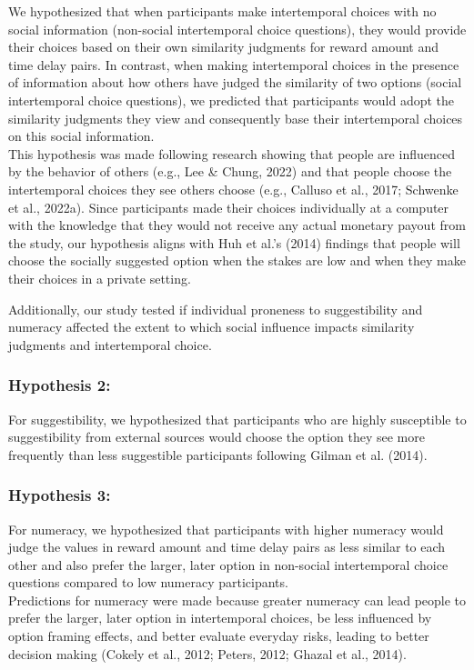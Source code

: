 \documentclass[
  pub,floatsintext]{apa6}
\begin{document}
We hypothesized that when participants make intertemporal choices with no social information (non-social intertemporal choice questions), they would provide their choices based on their own similarity judgments for reward amount and time delay pairs. In contrast, when making intertemporal choices in the presence of information about how others have judged the similarity of two options (social intertemporal choice questions), we predicted that participants would adopt the similarity judgments they view and consequently base their intertemporal choices on this social information.\\
This hypothesis was made following research showing that people are influenced by the behavior of others (e.g., Lee \& Chung, 2022) and that people choose the intertemporal choices they see others choose (e.g., Calluso et al., 2017; Schwenke et al., 2022a). Since participants made their choices individually at a computer with the knowledge that they would not receive any actual monetary payout from the study, our hypothesis aligns with Huh et al.'s (2014) findings that people will choose the socially suggested option when the stakes are low and when they make their choices in a private setting.

Additionally, our study tested if individual proneness to suggestibility and numeracy affected the extent to which social influence impacts similarity judgments and intertemporal choice.

\hypertarget{hypothesis-2}{%
\subsubsection{Hypothesis 2:}\label{hypothesis-2}}

For suggestibility, we hypothesized that participants who are highly susceptible to suggestibility from external sources would choose the option they see more frequently than less suggestible participants following Gilman et al. (2014).

\hypertarget{hypothesis-3}{%
\subsubsection{Hypothesis 3:}\label{hypothesis-3}}

For numeracy, we hypothesized that participants with higher numeracy would judge the values in reward amount and time delay pairs as less similar to each other and also prefer the larger, later option in non-social intertemporal choice questions compared to low numeracy participants.\\
Predictions for numeracy were made because greater numeracy can lead people to prefer the larger, later option in intertemporal choices, be less influenced by option framing effects, and better evaluate everyday risks, leading to better decision making (Cokely et al., 2012; Peters, 2012; Ghazal et al., 2014).
\end{document}
